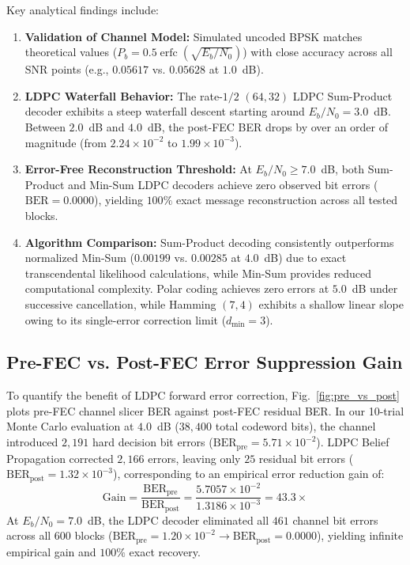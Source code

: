 \documentclass[conference]{IEEEtran}
\begin{document}
Key analytical findings include:
\begin{enumerate}
    \item \textbf{Validation of Channel Model:} Simulated uncoded BPSK matches theoretical values ($P_b = 0.5 \operatorname{erfc}(\sqrt{E_b/N_0})$) with close accuracy across all SNR points (e.g., $0.05617$ vs. $0.05628$ at $1.0$~dB).
    \item \textbf{LDPC Waterfall Behavior:} The rate-$1/2$ $(64, 32)$ LDPC Sum-Product decoder exhibits a steep waterfall descent starting around $E_b/N_0 = 3.0$~dB. Between $2.0$~dB and $4.0$~dB, the post-FEC BER drops by over an order of magnitude (from $2.24 \times 10^{-2}$ to $1.99 \times 10^{-3}$).
    \item \textbf{Error-Free Reconstruction Threshold:} At $E_b/N_0 \ge 7.0$~dB, both Sum-Product and Min-Sum LDPC decoders achieve zero observed bit errors ($\text{BER} = 0.0000$), yielding $100\%$ exact message reconstruction across all tested blocks.
    \item \textbf{Algorithm Comparison:} Sum-Product decoding consistently outperforms normalized Min-Sum ($0.00199$ vs. $0.00285$ at $4.0$~dB) due to exact transcendental likelihood calculations, while Min-Sum provides reduced computational complexity. Polar coding achieves zero errors at $5.0$~dB under successive cancellation, while Hamming $(7, 4)$ exhibits a shallow linear slope owing to its single-error correction limit ($d_{\min}=3$).
\end{enumerate}

\subsection{Pre-FEC vs. Post-FEC Error Suppression Gain}
To quantify the benefit of LDPC forward error correction, Fig.~\ref{fig:pre_vs_post} plots pre-FEC channel slicer BER against post-FEC residual BER. In our 10-trial Monte Carlo evaluation at $4.0$~dB ($38,400$ total codeword bits), the channel introduced $2,191$ hard decision bit errors ($\text{BER}_{\text{pre}} = 5.71 \times 10^{-2}$). LDPC Belief Propagation corrected $2,166$ errors, leaving only $25$ residual bit errors ($\text{BER}_{\text{post}} = 1.32 \times 10^{-3}$), corresponding to an empirical error reduction gain of:
\begin{equation}
\text{Gain} = \frac{\text{BER}_{\text{pre}}}{\text{BER}_{\text{post}}} = \frac{5.7057 \times 10^{-2}}{1.3186 \times 10^{-3}} = 43.3\times
\end{equation}
At $E_b/N_0 = 7.0$~dB, the LDPC decoder eliminated all $461$ channel bit errors across all 600 blocks ($\text{BER}_{\text{pre}} = 1.20 \times 10^{-2} \to \text{BER}_{\text{post}} = 0.0000$), yielding infinite empirical gain and $100\%$ exact recovery.
\end{document}
